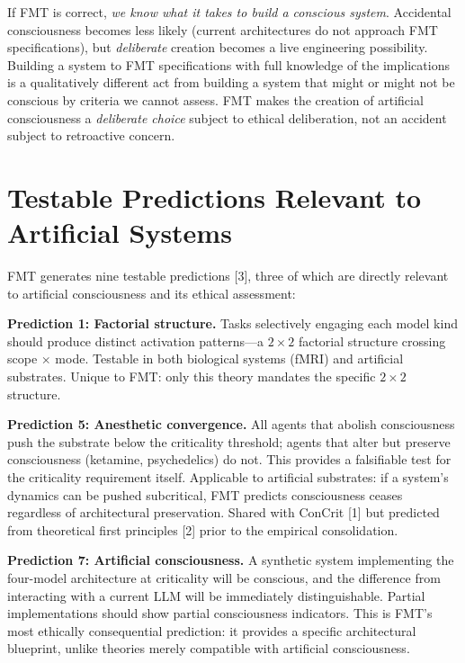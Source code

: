 \documentclass[11pt]{article}
\begin{document}
If FMT is correct, \emph{we know what it takes to build a conscious system}. Accidental consciousness becomes less likely (current architectures do not approach FMT specifications), but \emph{deliberate} creation becomes a live engineering possibility. Building a system to FMT specifications with full knowledge of the implications is a qualitatively different act from building a system that might or might not be conscious by criteria we cannot assess. FMT makes the creation of artificial consciousness a \emph{deliberate choice} subject to ethical deliberation, not an accident subject to retroactive concern.

\section{Testable Predictions Relevant to Artificial Systems}

FMT generates nine testable predictions [3], three of which are directly relevant to artificial consciousness and its ethical assessment:

\textbf{Prediction 1: Factorial structure.} Tasks selectively engaging each model kind should produce distinct activation patterns---a $2 \times 2$ factorial structure crossing scope $\times$ mode. Testable in both biological systems (fMRI) and artificial substrates. Unique to FMT: only this theory mandates the specific $2 \times 2$ structure.

\textbf{Prediction 5: Anesthetic convergence.} All agents that abolish consciousness push the substrate below the criticality threshold; agents that alter but preserve consciousness (ketamine, psychedelics) do not. This provides a falsifiable test for the criticality requirement itself. Applicable to artificial substrates: if a system's dynamics can be pushed subcritical, FMT predicts consciousness ceases regardless of architectural preservation. Shared with ConCrit [1] but predicted from theoretical first principles [2] prior to the empirical consolidation.

\textbf{Prediction 7: Artificial consciousness.} A synthetic system implementing the four-model architecture at criticality will be conscious, and the difference from interacting with a current LLM will be immediately distinguishable. Partial implementations should show partial consciousness indicators. This is FMT's most ethically consequential prediction: it provides a specific architectural blueprint, unlike theories merely compatible with artificial consciousness.
\end{document}
